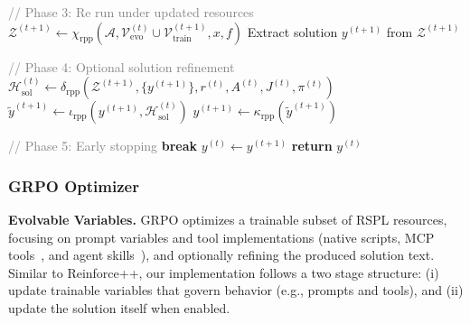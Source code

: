 \begin{algorithm}[t]
\begin{algorithmic}[1]
      \vspace{0.1em}
      \STATE \textcolor{gray}{// Phase 3: Re run under updated resources}
      \STATE $\mathcal{Z}^{(t+1)} \leftarrow \chi_{\mathrm{rpp}}(\mathcal{A}, \mathcal{V}_{\text{evo}}^{(t)} \cup \mathcal{V}_{\text{train}}^{(t+1)}, x, f)$
      \STATE Extract solution $y^{(t+1)}$ from $\mathcal{Z}^{(t+1)}$

      \vspace{0.1em}
      \STATE \textcolor{gray}{// Phase 4: Optional solution refinement}
      \STATE $\mathcal{H}_{\text{sol}}^{(t)} \leftarrow \delta_{\mathrm{rpp}}(\mathcal{Z}^{(t+1)}, \{y^{(t+1)}\}, r^{(t)}, A^{(t)}, J^{(t)}, \pi^{(t)})$ 
      \STATE $\widetilde{y}^{(t+1)} \leftarrow \iota_{\mathrm{rpp}}(y^{(t+1)}, \mathcal{H}_{\text{sol}}^{(t)})$ 
      \STATE $y^{(t+1)} \leftarrow \kappa_{\mathrm{rpp}}(\widetilde{y}^{(t+1)})$ 
      
      \vspace{0.1em}
      \STATE \textcolor{gray}{// Phase 5: Early stopping}
          \STATE \textbf{break}
      \ENDIF
      \STATE $y^{(t)} \leftarrow y^{(t+1)}$ 
  \ENDFOR
  \STATE \textbf{return} $y^{(t)}$
  \end{algorithmic}
  \end{algorithm}

\subsubsection{GRPO Optimizer}

\textbf{Evolvable Variables.}
GRPO optimizes a trainable subset of RSPL resources, focusing on prompt variables and tool implementations (native scripts, MCP tools~\citep{anthropic2025}, and agent skills~\citep{anthropic2025agentskills}), and optionally refining the produced solution text. Similar to Reinforce++, our implementation follows a two stage structure: (i) update trainable variables that govern behavior (e.g., prompts and tools), and (ii) update the solution itself when enabled.

